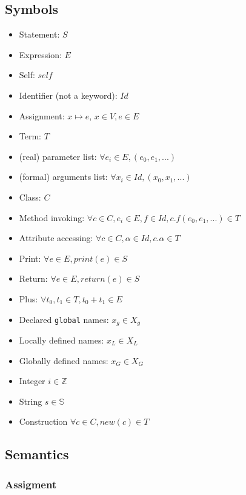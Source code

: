 \documentclass[]{article}
\numberwithin{equation}{section}
\numberwithin{figure}{section}
\numberwithin{table}{section}
\begin{document}
\subsection{Symbols}\label{symbols}

\begin{itemize}
\itemsep1pt\parskip0pt
\item
  Statement: $S$
\item
  Expression: $E$
\item
  Self: $self$
\item
  Identifier (not a keyword): $Id$
\item
  Assignment: $x \mapsto e$, $x \in V, e \in E$
\item
  Term: $T$
\item
  (real) parameter list: $\forall e_i \in E, (e_0, e_1, ...)$
\item
  (formal) arguments list: $\forall x_i \in Id, (x_0, x_1, ...)$
\item
  Class: $C$
\item
  Method invoking:
  $\forall c \in C, e_i \in E, f \in Id, c.f(e_0, e_1, ...) \in T$
\item
  Attribute accessing: $\forall c \in C, \alpha \in Id, c.\alpha \in T$
\item
  Print: $\forall e \in E, print(e) \in S$
\item
  Return: $\forall e \in E, return(e) \in S$
\item
  Plus: $\forall t_0, t_1 \in T, t_0 + t_1 \in E$
\item
  Declared \texttt{global} names: $x_g \in X_g$
\item
  Locally defined names: $x_L \in X_L$
\item
  Globally defined names: $x_G \in X_G$
\item
  Integer $i \in \mathbb Z$
\item
  String $s \in \mathbb S$
\item
  Construction $\forall c \in C, new(c) \in T$
\end{itemize}

\subsection{Semantics}\label{semantics}

\subsubsection{Assigment}\label{assigment}
\end{document}
